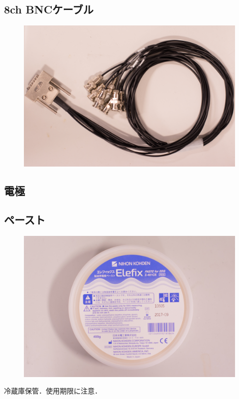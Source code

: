\documentclass[a4j, twocolumn, openleft, uplatex, dvipdfmx]{jsbook}
\begin{document}
        \subsection*{8ch BNCケーブル}
            \begin{figure}[H]
                \centering
                \includegraphics[width=0.6\linewidth]{./figure/bnc-8ch.jpg}
            \end{figure}
        \subsection*{電極}
        \subsection*{ペースト}
            \begin{figure}[H]
                \centering
                \includegraphics[width=0.6\linewidth]{./figure/elefix.jpg}
            \end{figure}
            冷蔵庫保管．使用期限に注意．
\end{document}
